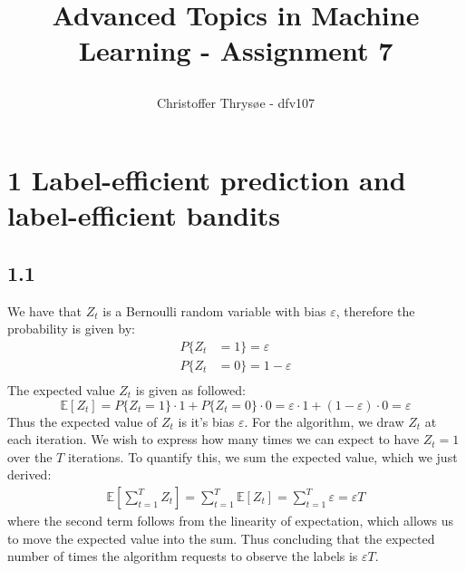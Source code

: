 \documentclass{article}
\title{
\vspace{1in}
\textmd{\textbf{Advanced Topics in Machine Learning - Assignment 7}} \\
\author{Christoffer Thrysøe - dfv107}
}
\begin{document}
\maketitle
{}
\section{1 Label-efficient prediction and label-efficient bandits}
\subsection{1.1}
We have that $Z_t$ is a Bernoulli random variable with bias $\varepsilon$, therefore the probability is given by:
\begin{align*}
P\lbrace Z_t &= 1 \rbrace = \varepsilon \\
P\lbrace Z_t &= 0 \rbrace = 1-\varepsilon \\
\end{align*}
The expected value $Z_t$ is given as followed:
\begin{equation}
\mathbb{E}[Z_t] = P\lbrace Z_t = 1 \rbrace \cdot 1 + P\lbrace Z_t = 0 \rbrace \cdot 0 = \varepsilon \cdot 1 + (1- \varepsilon) \cdot 0 = \varepsilon
\end{equation}
Thus the expected value of $Z_t$ is it's bias $\varepsilon$. For the algorithm, we draw $Z_t$ at each iteration. We wish to express how many times we can expect to have $Z_t = 1$ over the $T$ iterations. To quantify this, we sum the expected value, which we just derived:
\begin{align}
\mathbb{E} \left[ \sum\limits_{t=1}^T Z_t \right] = \sum\limits_{t=1}^T  \mathbb{E}[ Z_t] = \sum\limits_{t=1}^T  \varepsilon = \varepsilon T
\end{align}
where the second term follows from the linearity of expectation, which allows us to move the expected value into the sum. Thus concluding that the expected number of times the algorithm requests to observe the labels is $\varepsilon T$.
\end{document}

